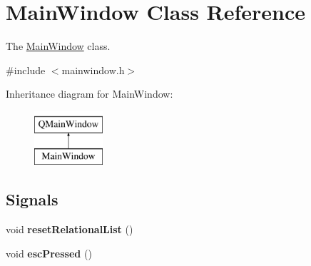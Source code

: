 \hypertarget{class_main_window}{}\section{Main\+Window Class Reference}
\label{class_main_window}


The \mbox{\hyperlink{class_main_window}{Main\+Window}} class.  




{\ttfamily \#include $<$mainwindow.\+h$>$}

Inheritance diagram for Main\+Window\+:\begin{figure}[H]
\begin{center}
\leavevmode
\includegraphics[height=2.000000cm]{class_main_window}
\end{center}
\end{figure}
\subsection*{Signals}
\begin{DoxyCompactItemize}
\item 
\mbox{\label{class_main_window_a46ebd786b1aeb0ef026f0a3f32dd9f3d}} 
void {\bfseries reset\+Relational\+List} ()
\item 
\mbox{\label{class_main_window_a6ac7f96512bac8c7be3a554147858b46}} 
void {\bfseries esc\+Pressed} ()
\end{DoxyCompactItemize}
